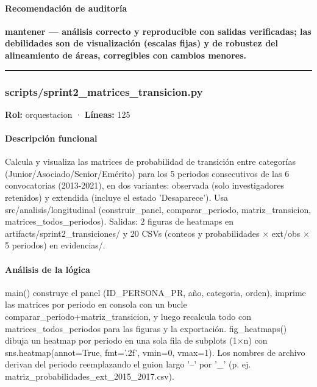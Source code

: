 \paragraph{Recomendación de auditoría}
\textbf{mantener --- análisis correcto y reproducible con salidas verificadas; las debilidades son de visualización (escalas fijas) y de robustez del alineamiento de áreas, corregibles con cambios menores.}

\medskip
\hrule

\subsubsection{scripts/sprint2\_matrices\_transicion.py}
\textbf{Rol:} orquestacion · \textbf{Líneas:} 125

\paragraph{Descripción funcional}
Calcula y visualiza las matrices de probabilidad de transición entre categorías (Junior/Asociado/Senior/Emérito) para los 5 periodos consecutivos de las 6 convocatorias (2013-2021), en dos variantes: observada (solo investigadores retenidos) y extendida (incluye el estado 'Desaparece'). Usa src/analisis/longitudinal (construir\_panel, comparar\_periodo, matriz\_transicion, matrices\_todos\_periodos). Salidas: 2 figuras de heatmaps en artifacts/sprint2\_transiciones/ y 20 CSVs (conteos y probabilidades $\times$ ext/obs $\times$ 5 periodos) en evidencias/.

\paragraph{Análisis de la lógica}
main() construye el panel (ID\_PERSONA\_PR, año, categoria, orden), imprime las matrices por periodo en consola con un bucle comparar\_periodo+matriz\_transicion, y luego recalcula todo con matrices\_todos\_periodos para las figuras y la exportación. fig\_heatmaps() dibuja un heatmap por periodo en una sola fila de subplots (1$\times$n) con sns.heatmap(annot=True, fmt='.2f', vmin=0, vmax=1). Los nombres de archivo derivan del periodo reemplazando el guion largo '--' por '\_' (p. ej. matriz\_probabilidades\_ext\_2015\_2017.csv).

